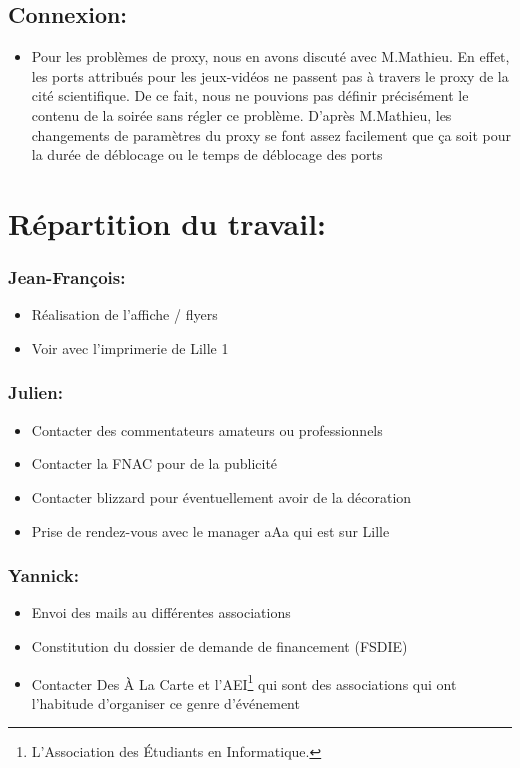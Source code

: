 \subsection{Connexion:}
\begin{itemize}
\item Pour les problèmes de proxy, nous en avons discuté avec M.Mathieu. En effet, les ports attribués pour les jeux-vidéos ne passent pas à travers le proxy de la cité scientifique. De ce fait, nous ne pouvions pas définir précisément le contenu de la soirée sans régler ce problème. D'après M.Mathieu, les changements de paramètres du proxy se font assez facilement que ça soit pour la durée de déblocage ou le temps de déblocage des ports
\end{itemize}

\section{Répartition du travail:}

\subsubsection{Jean-François:}
\begin{itemize}
\item Réalisation de l'affiche / flyers
\item Voir avec l'imprimerie de Lille 1
\end{itemize}

\subsubsection{Julien:}
\begin{itemize}
\item Contacter des commentateurs amateurs ou professionnels
\item Contacter la FNAC pour de la publicité
\item Contacter blizzard pour éventuellement avoir de la décoration
\item Prise de rendez-vous avec le manager aAa qui est sur Lille
\end{itemize}

\subsubsection{Yannick:}
\begin{itemize}
\item Envoi des mails au différentes associations
\item Constitution du dossier de demande de financement (FSDIE)
\item Contacter \og Des À La Carte \fg{} et l'AEI\footnote{L'Association des Étudiants en Informatique.} qui sont des associations qui ont l'habitude d'organiser ce genre d’événement
\end{itemize}
